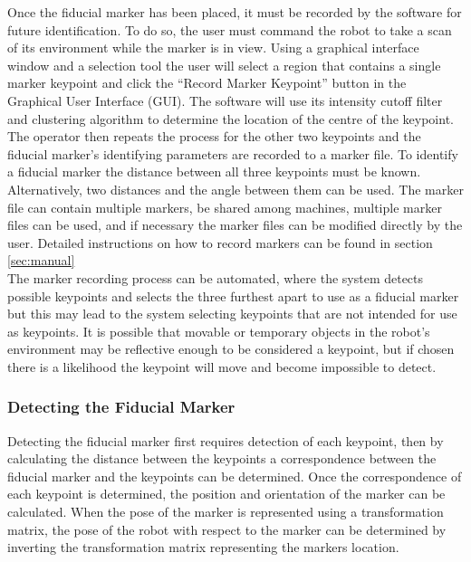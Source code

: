 Once the fiducial marker has been placed, it must be recorded by the software for future identification. To do so, the user must command the robot to take a scan of its environment while the marker is in view. Using a graphical interface window and a selection tool the user will select a region that contains a single marker keypoint and click the ``Record Marker Keypoint'' button in the Graphical User Interface (GUI). The software will use its intensity cutoff filter and clustering algorithm to determine the location of the centre of the keypoint. The operator then repeats the process for the other two keypoints and the fiducial marker's identifying parameters are recorded to a marker file. To identify a fiducial marker the distance between all three keypoints must be known. Alternatively, two distances and the angle between them can be used. The marker file can contain multiple markers, be shared among machines, multiple marker files can be used, and if necessary the marker files can be modified directly by the user. Detailed instructions on how to record markers can be found in section \ref{sec:manual}\\

The marker recording process can be automated, where the system detects possible keypoints and selects the three furthest apart to use as a fiducial marker but this may lead to the system selecting keypoints that are not intended for use as keypoints. It is possible that movable or temporary objects in the robot's environment may be reflective enough to be considered a keypoint, but if chosen there is a likelihood the keypoint will move and become impossible to detect.\\

\subsubsection{Detecting the Fiducial Marker}

Detecting the fiducial marker first requires detection of each keypoint, then by calculating the distance between the keypoints a correspondence between the fiducial marker and the keypoints can be determined. Once the correspondence of each keypoint is determined, the position and orientation of the marker can be calculated. When the pose of the marker is represented using a transformation matrix, the pose of the robot with respect to the marker can be determined by inverting the transformation matrix representing the markers location.\\

